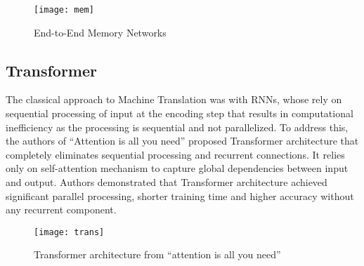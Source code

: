 \documentclass[11pt]{article}
\begin{document}
\begin{figure}[h]
\centerline{\texttt{[image: mem]}}
\caption{End-to-End Memory Networks}
\label{fig}
\end{figure}

\subsection{Transformer} 
The classical approach to Machine Translation was with RNNs, whose rely on sequential processing of input at the encoding step that results in computational inefficiency as the processing is sequential and not parallelized. To address this, the authors of ``Attention is all you need''\cite{att} proposed Transformer architecture that completely eliminates sequential processing and recurrent connections. It relies only on self-attention mechanism to capture global dependencies between input and output. Authors demonstrated that Transformer architecture achieved significant parallel processing, shorter training time and higher accuracy without any recurrent component. 

\begin{figure}[h]
\centerline{\texttt{[image: trans]}}
\caption{Transformer architecture from ``attention is all you need''}
\label{fig}
\end{figure}
\end{document}
